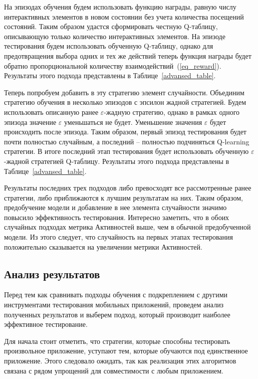 На эпизодах обучения будем использовать функцию награды, равную числу интерактивных элементов в новом состоянии без учета количества посещений состояний. Таким образом удастся сформировать честную Q-таблицу, описывающую только количество интерактивных элементов. На эпизоде тестирования будем использовать обученную Q-таблицу, однако для предотвращения выбора одних и тех же действий теперь функция награды будет обратно пропорциональной количеству взаимодействий~(\ref{eq_reward}). Результаты этого подхода представлены в Таблице~\ref{advansed_table}.

Теперь попробуем добавить в эту стратегию элемент случайности. Объединим стратегию обучения в несколько эпизодов с эпсилон жадной стратегией. Будем использовать описанную ранее $\varepsilon$-жадную стратегию, однако в рамках одного эпизода значение $\varepsilon$ уменьшаться не будет. Уменьшение значения $\varepsilon$ будет происходить после эпизода. Таким образом, первый эпизод тестирования будет почти полностью случайным, а последний -- полностью подчиняться Q-learning стратегии. В итоге последний этап тестирования будет использовать обученную $\varepsilon$-жадной стратегией Q-таблицу. Результаты этого подхода представлены в Таблице~\ref{advansed_table}.


Результаты последних трех подходов либо превосходят все рассмотренные ранее стратегии, либо приближаются к лучшим результатам на них. Таким образом, предобучение модели и добавление в нее элемента случайности значимо повысило эффективность тестирования. Интересно заметить, что в обоих случайных подходах метрика Активностей выше, чем в обычной предобученной модели. Из этого следует, что случайность на первых этапах тестирования положительно сказывается на увеличении метрики Активностей.

\subsection{Анализ результатов}

Перед тем как сравнивать подходы обучения с подкреплением с другими инструментами тестирования мобильных приложений, проведем анализ полученных результатов и выберем подход, который производит наиболее эффективное тестирование.

Для начала стоит отметить, что стратегии, которые способны тестировать произвольное приложение, уступают тем, которые обучаются под единственное приложение. Этого следовало ожидать, так как реализация этих алгоритмов связана с рядом упрощений для совместимости с любым приложением.

